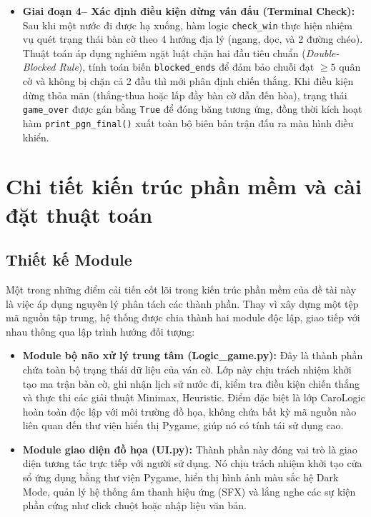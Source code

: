 \begin{itemize}
	\item \textbf{Giai đoạn 4-- Xác định điều kiện dừng ván đấu (Terminal Check):} 
	Sau khi một nước đi được hạ xuống, hàm logic \texttt{check\_win} thực hiện nhiệm vụ quét trạng thái bàn cờ theo 4 hướng địa lý (ngang, dọc, và 2 đường chéo). Thuật toán áp dụng nghiêm ngặt luật chặn hai đầu tiêu chuẩn (\textit{Double-Blocked Rule}), tính toán biến \texttt{blocked\_ends} để đảm bảo chuỗi đạt $\ge 5$ quân cờ và không bị chặn cả 2 đầu thì mới phân định chiến thắng. Khi điều kiện dừng thỏa mãn (thắng-thua hoặc lấp đầy bàn cờ dẫn đến hòa), trạng thái \texttt{game\_over} được gán bằng \texttt{True} để đóng băng tương ứng, đồng thời kích hoạt hàm \texttt{print\_pgn\_final()} xuất toàn bộ biên bản trận đấu ra màn hình điều khiển.
\end{itemize}

\section{Chi tiết kiến trúc phần mềm và cài đặt thuật toán}
\subsection{Thiết kế Module}

Một trong những điểm cải tiến cốt lõi trong kiến trúc phần mềm của đề tài này là việc áp dụng nguyên lý phân tách các thành phần. Thay vì xây dựng một tệp mã nguồn tập trung, hệ thống được chia thành hai module độc lập, giao tiếp với nhau thông qua lập trình hướng đối tượng:
\begin{itemize}
	\item \textbf{Module bộ não xử lý trung tâm (Logic\_game.py):} Đây là thành phần chứa toàn bộ trạng thái dữ liệu của ván cờ. Lớp này chịu trách nhiệm khởi tạo ma trận bàn cờ, ghi nhận lịch sử nước đi, kiểm tra điều kiện chiến thắng và thực thi các giải thuật Minimax, Heuristic. Điểm đặc biệt là lớp CaroLogic hoàn toàn độc lập với môi trường đồ họa, không chứa bất kỳ mã nguồn nào liên quan đến thư viện hiển thị Pygame, giúp nó có tính tái sử dụng cao.
	\item \textbf{Module giao diện đồ họa (UI.py):} Thành phần này đóng vai trò là giao diện tương tác trực tiếp với người sử dụng. Nó chịu trách nhiệm khởi tạo cửa sổ ứng dụng bằng thư viện Pygame, hiển thị hình ảnh màu sắc hệ Dark Mode, quản lý hệ thống âm thanh hiệu ứng (SFX) và lắng nghe các sự kiện phần cứng như click chuột hoặc nhập liệu văn bản.
\end{itemize}

